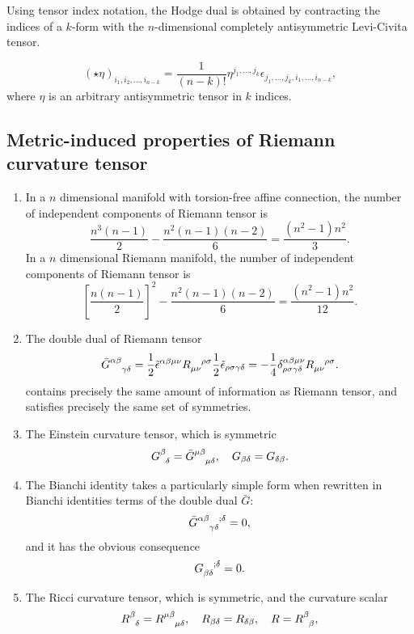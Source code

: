 \noindent
Using tensor index notation, the Hodge dual is obtained by contracting the indices of a $k$-form with the $n$-dimensional completely antisymmetric Levi-Civita tensor.\\

\begin{newprop}
\[(\star \eta )_{i_{1},i_{2},\ldots ,i_{n-k}}={\frac {1}{(n-k)!}}\eta ^{j_{1},\ldots ,j_{k}} \epsilon _{j_{1},\ldots ,j_{k},i_{1},\ldots ,i_{n-k}},\]
where $\eta$ is an arbitrary antisymmetric tensor in $k$ indices. 
\end{newprop}

\subsection{Metric-induced properties of Riemann curvature tensor}
\begin{enumerate}
\item In a $n$ dimensional manifold with torsion-free affine connection, the number of independent components of Riemann tensor is \[\frac{n^3(n-1)}{2} - \frac{n^2(n-1)(n-2)}{6} = \frac{(n^2-1)n^2}{3}.\]
In a $n$ dimensional Riemann manifold,  the number of independent components of Riemann tensor is \[\left[\frac{n(n-1)}{2}\right]^2 -\frac{n^2(n-1)(n-2)}{6} = \frac{(n^2-1)n^2}{12} .\]
\item  The double dual of Riemann tensor
\[\tensor{\bar{G}}{^{\alpha \beta}_{\gamma \delta}} = \frac{1}{2} \tilde{\epsilon}^{\alpha \beta \mu \nu} \tensor{R}{_{\mu \nu}^{\rho \sigma}} \frac{1}{2} \tilde{\epsilon}_{\rho \sigma \gamma \delta} = -\frac{1}{4} \delta^{\alpha \beta \mu \nu}_{\rho \sigma \gamma \delta} \tensor{R}{_{\mu \nu}^{ \rho \sigma}}.\]
contains precisely the same amount of information as
Riemann tensor, and satisfies precisely the same set of symmetries.
\item The Einstein curvature tensor, which is symmetric
\[\tensor{G}{^{\beta}_{\delta}} = \tensor{\bar{G}}{^{\mu \beta}_{\mu \delta}}, \quad G_{\beta \delta}=G_{\delta \beta}.\]
\item The Bianchi identity takes a particularly simple form when rewritten in Bianchi identities terms of the double dual $\bar{G}$:
\[\tensor{\bar{G}}{^{\alpha \beta }_{\gamma \delta}^{;\delta}} = 0,\]
and it has the obvious consequence
\[\tensor{G}{_{\beta \delta}^{;\delta}} = 0.\]
\item The Ricci curvature tensor, which is symmetric, and the curvature scalar
\[\tensor{R}{^{\beta}_{\delta}} = \tensor{R}{^{\mu \beta}_{\mu \delta}} , \quad R_{\beta \delta}=R_{\delta \beta}, \quad R = \tensor{R}{^{\beta}_{\beta}},\]

\end{enumerate}
